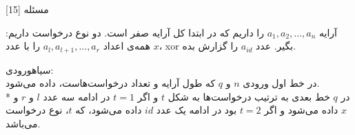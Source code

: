 ‌مسئله [15]


% 
%
%
% 
آرایه 
$a_1 , a_2 , ... , a_n$
را داریم که در ابتدا کل آرایه صفر است.
دو نوع درخواست داریم:
همه‌ی اعداد 
$a_l , a_{l+1} , ..., a_r$
را با عدد $x$، 
xor 
بگیر.
عدد 
$a_{id}$
 را گزارش بده.

\noindent
{}‌سیاه{ورودی:}\\
در خط اول ورودی $n$ و $q$ که طول آرایه و تعداد درخواست‌هاست، داده می‌شود.\\*
در $q$ خط بعدی به ترتیب درخواست‌ها به شکل $t$ و اگر 
$t = 1$
 در ادامه سه عدد $l$ و $r$ و $x$ داده می‌شود و اگر
 $t = 2$
 بود در ادامه یک عدد $id$ داده می‌شود، که $t$، نوع درخواست می‌باشد.

